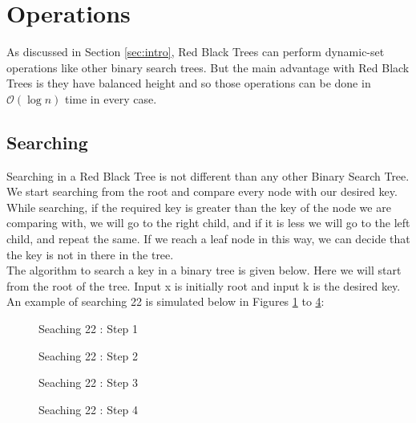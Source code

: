 \documentclass{article}[10pt]
\begin{document}
\section{Operations}
As discussed in Section \ref{sec:intro}, Red Black Trees can perform dynamic-set operations like other binary search trees. But the main advantage with Red Black Trees is they have balanced height and so those operations can be done in $\mathcal{O}(\log n)$ time in every case.

\subsection{Searching}
Searching in a Red Black Tree is not different than any other Binary Search Tree. We start searching from the root and compare every node with our desired key. While searching, if the required key is greater than the key of the node we are comparing with, we will go to the right child, and if it is less we will go to the left child, and repeat the same. If we reach a leaf node in this way, we can decide that the key is not in there in the tree.\\ 
The algorithm to search a key in a binary tree is given below. Here we will start from the root of the tree. Input x is initially root and input k is the desired key.\\



An example of searching 22 is simulated below in Figures \ref{fig:search1} to \ref{fig:search4}:\\

\begin{figure}[htbp]
	\centering
	
	\caption{Seaching 22 : Step 1} 
	\label{fig:search1}
\end{figure}

\begin{figure}
	\centering
	
	\caption{Seaching 22 : Step 2} 
	\label{fig:search2}
\end{figure}

\begin{figure}
	\centering
	
	\caption{Seaching 22 : Step 3}
	\label{fig:search3}
\end{figure}

\begin{figure}
	\centering
	
	\caption{Seaching 22 : Step 4} %
	\label{fig:search4}
\end{figure}
\end{document}
